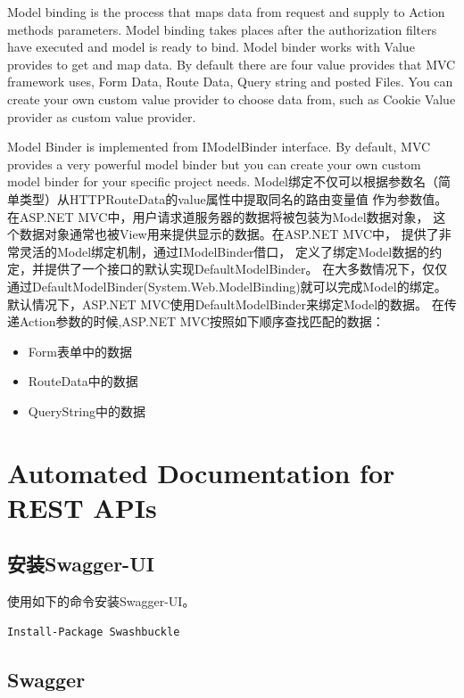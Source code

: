 \documentclass{book}
\begin{document}
Model binding is the process that maps data from request and supply to Action methods parameters. 
Model binding takes places after the authorization filters have executed and model is ready to bind. 
Model binder works with Value provides to get and map data. By default there 
are four value provides that MVC framework uses, Form Data, Route Data, 
Query string and posted Files. You can create your own custom value provider to choose data from, 
such as Cookie Value provider as custom value provider.

Model Binder is implemented from IModelBinder interface. 
By default, MVC provides a very powerful model binder but you can create your 
own custom model binder for your specific project needs. 
Model绑定不仅可以根据参数名（简单类型）从HTTPRouteData的value属性中提取同名的路由变量值
作为参数值。在ASP.NET MVC中，用户请求道服务器的数据将被包装为Model数据对象，
这个数据对象通常也被View用来提供显示的数据。在ASP.NET MVC中，
提供了非常灵活的Model绑定机制，通过IModelBinder借口，
定义了绑定Model数据的约定，并提供了一个接口的默认实现DefaultModelBinder。
在大多数情况下，仅仅通过DefaultModelBinder(System.Web.ModelBinding)就可以完成Model的绑定。
默认情况下，ASP.NET MVC使用DefaultModelBinder来绑定Model的数据。
在传递Action参数的时候,ASP.NET MVC按照如下顺序查找匹配的数据：

\begin{itemize}
\item{Form表单中的数据}
\item{RouteData中的数据}
\item{QueryString中的数据}
\end{itemize}
    
\section{Automated Documentation for REST APIs}

\subsection{安装Swagger-UI}

使用如下的命令安装Swagger-UI。

\begin{lstlisting}[language=Bash]
Install-Package Swashbuckle
\end{lstlisting}


\subsection{Swagger}
\end{document}
